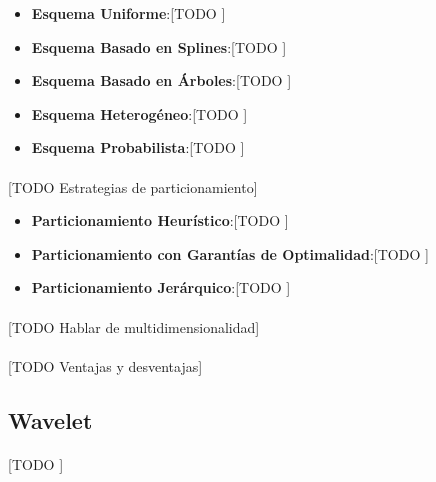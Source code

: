 \documentclass{subfiles}
\begin{document}
        \begin{itemize}

          \item \textbf{Esquema Uniforme}:[TODO ]

          \item \textbf{Esquema Basado en Splines}:[TODO ]

          \item \textbf{Esquema Basado en Árboles}:[TODO ]

          \item \textbf{Esquema Heterogéneo}:[TODO ]

          \item \textbf{Esquema Probabilista}:[TODO ]

        \end{itemize}


        \paragraph{}
        [TODO Estrategias de particionamiento]

        \begin{itemize}

          \item \textbf{Particionamiento Heurístico}:[TODO ]

          \item \textbf{Particionamiento con Garantías de Optimalidad}:[TODO ]

          \item \textbf{Particionamiento Jerárquico}:[TODO ]

        \end{itemize}

        \paragraph{}
        [TODO Hablar de multidimensionalidad]

        \paragraph{}
        [TODO Ventajas y desventajas]

      \subsection{Wavelet}
      \label{sec:wavelet}

        \paragraph{}
        [TODO ]
\end{document}
